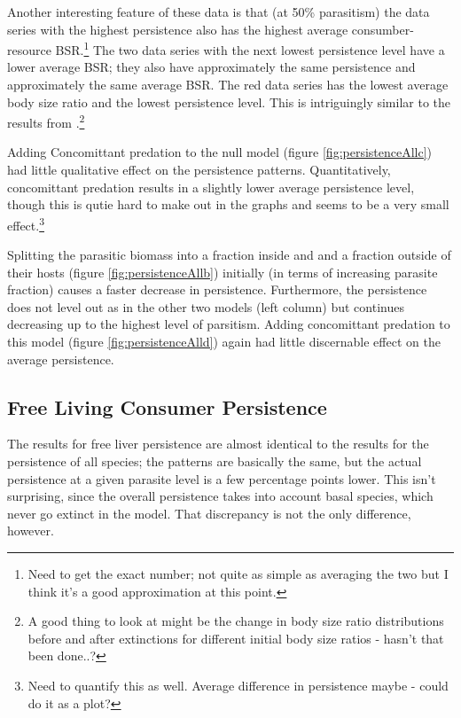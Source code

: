 \documentclass[11pt]{amsart}
\begin{document}
Another interesting feature of these data is that (at 50\% parasitism) the data series with the highest persistence also has the highest average consumber-resource BSR.\footnote{Need to get the exact number; not quite as simple as averaging the two but I think it's a good approximation at this point.}  The two data series with the next lowest persistence level have a lower average BSR; they also have approximately the same persistence and approximately the same average BSR.  The red data series has the lowest average body size ratio and the lowest persistence level.  This is intriguingly similar to the results from \cite{Brose2006}.\footnote{A good thing to look at might be the change in body size ratio distributions before and after extinctions for different initial body size ratios - hasn't that been done..?}

Adding Concomittant predation to the null model (figure \ref{fig:persistenceAllc}) had little qualitative effect on the persistence patterns.  Quantitatively, concomittant predation results in a slightly lower average persistence level, though this is qutie hard to make out in the graphs and seems to be a very small effect.\footnote{Need to quantify this as well.  Average difference in persistence maybe - could do it as a plot?}

Splitting the parasitic biomass into a fraction inside and and a fraction outside of their hosts (figure \ref{fig:persistenceAllb}) initially (in terms of increasing parasite fraction) causes a faster decrease in persistence.  
Furthermore, the persistence does not level out as in the other two models (left column) but continues decreasing up to the highest level of parsitism.  Adding concomittant predation to this model (figure \ref{fig:persistenceAlld}) again had little discernable effect on the average persistence.



\subsection{Free Living Consumer Persistence \label{sec:persistenceFree}}

The results for free liver persistence are almost identical to the results for the persistence of all species; the patterns are basically the same, but the actual persistence at a given parasite level is a few percentage points lower.  This isn't surprising, since the overall persistence takes into account basal species, which never go extinct in the model.  That discrepancy is not the only difference, however.
\end{document}
